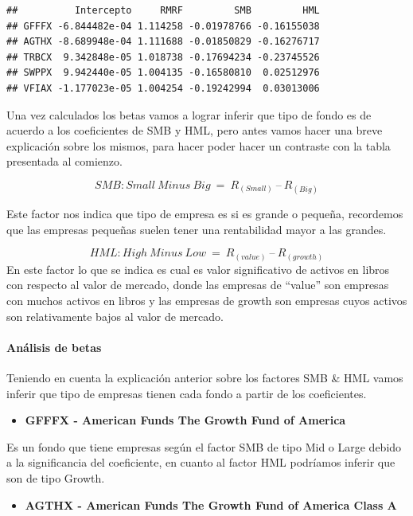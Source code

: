 \documentclass[
  12pt,
]{article}
\providecommand{\tightlist}{%
  \setlength{\itemsep}{0pt}\setlength{\parskip}{0pt}}
\begin{document}
\begin{verbatim}
##          Intercepto     RMRF         SMB         HML
## GFFFX -6.844482e-04 1.114258 -0.01978766 -0.16155038
## AGTHX -8.689948e-04 1.111688 -0.01850829 -0.16276717
## TRBCX  9.342848e-05 1.018738 -0.17694234 -0.23745526
## SWPPX  9.942440e-05 1.004135 -0.16580810  0.02512976
## VFIAX -1.177023e-05 1.004254 -0.19242994  0.03013006
\end{verbatim}

Una vez calculados los betas vamos a lograr inferir que tipo de fondo es
de acuerdo a los coeficientes de SMB y HML, pero antes vamos hacer una
breve explicación sobre los mismos, para hacer poder hacer un contraste
con la tabla presentada al comienzo.

\[
SMB:Small\ Minus\ Big\ =\ R_{\left(Small\right)}\ –\ R_{\left(Big\right)}
\]

Este factor nos indica que tipo de empresa es si es grande o pequeña,
recordemos que las empresas pequeñas suelen tener una rentabilidad mayor
a las grandes.

\[
HML:High\ Minus\ Low\ =\ R_{\left(value\right)}\ –\ R_{\left(growth\right)}
\] En este factor lo que se indica es cual es valor significativo de
activos en libros con respecto al valor de mercado, donde las empresas
de ``value'' son empresas con muchos activos en libros y las empresas de
growth son empresas cuyos activos son relativamente bajos al valor de
mercado.

\hypertarget{anuxe1lisis-de-betas}{%
\paragraph{Análisis de betas}\label{anuxe1lisis-de-betas}}

Teniendo en cuenta la explicación anterior sobre los factores SMB \& HML
vamos inferir que tipo de empresas tienen cada fondo a partir de los
coeficientes.

\begin{itemize}
\tightlist
\item
  \textbf{GFFFX - American Funds The Growth Fund of America}
\end{itemize}

Es un fondo que tiene empresas según el factor SMB de tipo Mid o Large
debido a la significancia del coeficiente, en cuanto al factor HML
podríamos inferir que son de tipo Growth.

\begin{itemize}
\tightlist
\item
  \textbf{AGTHX - American Funds The Growth Fund of America Class A}
\end{itemize}
\end{document}
